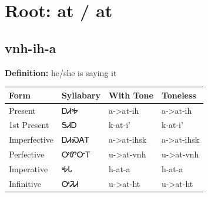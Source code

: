 \documentclass{article}%
\begin{document}
%
\normalsize%
\section*{Root: at / at}%
\subsection*{vnh-ih-a}%
\textbf{Definition: }%
he/she is saying it%
\\[0.5em]%
\begin{tabular}{|l|l|l|l|}%
\hline%
\textbf{Form}&\textbf{Syllabary}&\textbf{With Tone}&\textbf{Toneless}\\%
\hline%
Present&ᎠᏗᎭ&a{-}>at{-}ih&a{-}>at{-}ih\\%
1st Present&ᎦᏗᎠ&k{-}at{-}i'&k{-}at{-}i'\\%
Imperfective&ᎠᏗᏍᎪᎢ&a{-}>at{-}ihsk&a{-}>at{-}ihsk\\%
Perfective&ᎤᏛᏅᎢ&u{-}>at{-}vnh&u{-}>at{-}vnh\\%
Imperative&ᎭᏓ&h{-}at{-}a&h{-}at{-}a\\%
Infinitive&ᎤᏘᏗ&u{-}>at{-}ht&u{-}>at{-}ht\\%
\hline%
\end{tabular}%
\\[1em]%
\end{document}

